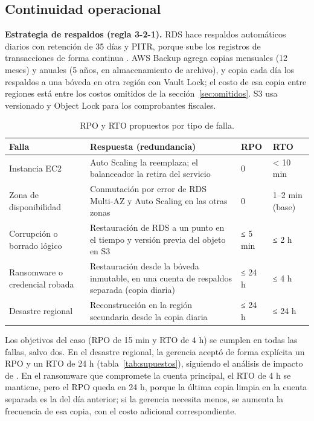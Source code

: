 \documentclass[11pt,letterpaper]{article}
\begin{document}
\subsection{Continuidad operacional}
\textbf{Estrategia de respaldos (regla 3-2-1).} RDS hace respaldos automáticos diarios con retención de 35 días y PITR, porque sube los registros de transacciones de forma continua \parencite{aws-rds-backup}. AWS Backup agrega copias mensuales (12 meses) y anuales (5 años, en almacenamiento de archivo), y copia cada día los respaldos a una bóveda en otra región con Vault Lock; el costo de esa copia entre regiones está entre los costos omitidos de la sección~\ref{sec:omitidos}. S3 usa versionado y Object Lock para los comprobantes fiscales.

\begin{table}[H]
\centering\footnotesize
\caption{RPO y RTO propuestos por tipo de falla.}\label{tab:rporto}
\begin{tabularx}{\linewidth}{L{3.3cm}YL{1.7cm}L{1.7cm}}
\toprule
\textbf{Falla} & \textbf{Respuesta (redundancia)} & \textbf{RPO} & \textbf{RTO}\\
\midrule
Instancia EC2 & Auto Scaling la reemplaza; el balanceador la retira del servicio & 0 & < 10 min\\
 Zona de disponibilidad & Conmutación por error de RDS Multi-AZ y Auto Scaling en las otras zonas & 0 & 1–2 min (base)\\
Corrupción o borrado lógico & Restauración de RDS a un punto en el tiempo y versión previa del objeto en S3 & ≤ 5 min & ≤ 2 h\\
 Ransomware o credencial robada & Restauración desde la bóveda inmutable, en una cuenta de respaldos separada (copia diaria) & ≤ 24 h & ≤ 4 h\\
Desastre regional & Reconstrucción en la región secundaria desde la copia diaria & ≤ 24 h & ≤ 24 h\\
\bottomrule
\end{tabularx}
\end{table}

Los objetivos del caso (RPO de 15 min y RTO de 4 h) se cumplen en todas las fallas, salvo dos. En el desastre regional, la gerencia aceptó de forma explícita un RPO y un RTO de 24 h (tabla~\ref{tab:supuestos}), siguiendo el análisis de impacto de \textcite{nist80034}. En el ransomware que compromete la cuenta principal, el RTO de 4 h se mantiene, pero el RPO queda en 24 h, porque la última copia limpia en la cuenta separada es la del día anterior; si la gerencia necesita menos, se aumenta la frecuencia de esa copia, con el costo adicional correspondiente.
\end{document}
